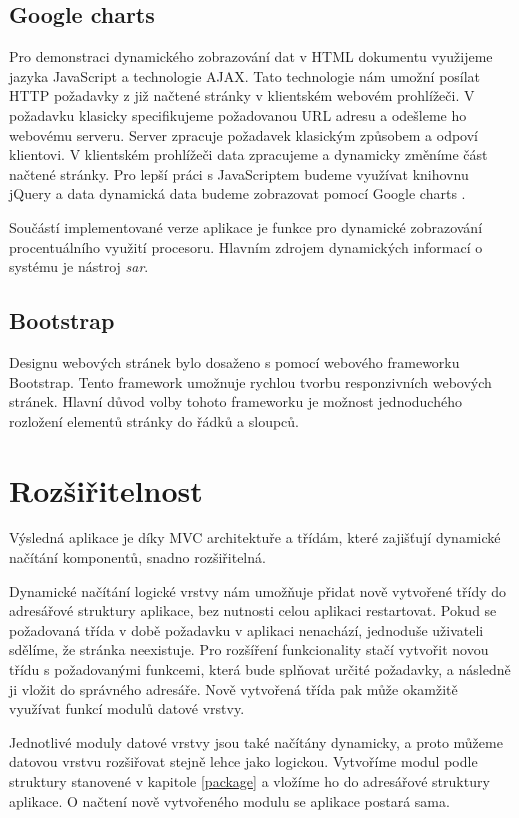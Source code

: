     \subsection{Google charts}
    Pro demonstraci dynamického zobrazování dat v HTML dokumentu využijeme jazyka JavaScript a technologie AJAX. Tato technologie nám umožní posílat HTTP požadavky z již načtené stránky v klientském webovém prohlížeči. V požadavku klasicky specifikujeme požadovanou URL adresu a odešleme ho webovému serveru. Server zpracuje požadavek klasickým způsobem a odpoví klientovi. V klientském prohlížeči data zpracujeme a dynamicky změníme část načtené stránky. Pro lepší práci s JavaScriptem budeme využívat knihovnu jQuery \cite{jquery} a data dynamická data budeme zobrazovat pomocí Google charts \cite{google}.

    Součástí implementované verze aplikace je funkce pro dynamické zobrazování procentuálního využití procesoru. Hlavním zdrojem dynamických informací o systému je nástroj \emph{sar}.
    \subsection{Bootstrap}
    Designu webových stránek bylo dosaženo s pomocí webového frameworku Bootstrap. Tento framework umožnuje rychlou tvorbu responzivních webových stránek. Hlavní důvod volby tohoto frameworku je možnost jednoduchého rozložení elementů stránky do řádků a sloupců. \cite{bootstrap}


\section{Rozšiřitelnost}
Výsledná aplikace je díky MVC architektuře a třídám, které zajišťují dynamické načítání komponentů, snadno rozšiřitelná.

Dynamické načítání logické vrstvy nám umožňuje přidat nově vytvořené třídy do adresářové struktury aplikace, bez nutnosti celou aplikaci restartovat. Pokud se požadovaná třída v době požadavku v aplikaci nenachází, jednoduše uživateli sdělíme, že stránka neexistuje. Pro rozšíření funkcionality stačí vytvořit novou třídu s požadovanými funkcemi, která bude splňovat určité požadavky, a následně ji vložit do správného adresáře. Nově vytvořená třída pak může okamžitě využívat funkcí modulů datové vrstvy.

Jednotlivé moduly datové vrstvy jsou také načítány dynamicky, a proto můžeme datovou vrstvu rozšiřovat stejně lehce jako logickou. Vytvoříme modul podle struktury stanovené v kapitole \ref{package} a vložíme ho do adresářové struktury aplikace. O načtení nově vytvořeného modulu se aplikace postará sama.

